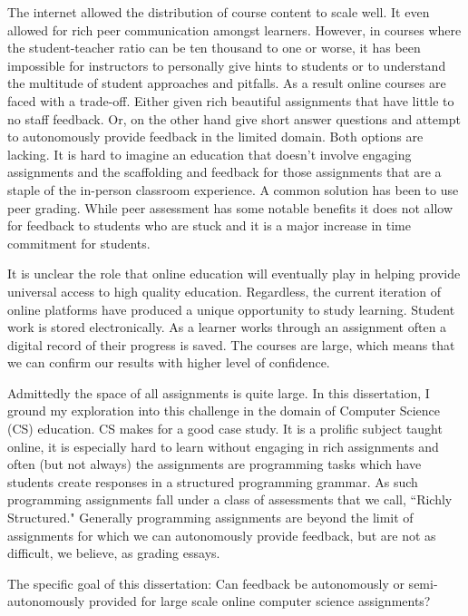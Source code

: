 The internet allowed the distribution of course content to scale well. It even allowed for rich peer communication amongst learners. However, in courses where the student-teacher ratio can be ten thousand to one or worse, it has been impossible for instructors to personally give hints to students or to understand the multitude of student approaches and pitfalls. As a result online courses are faced with a trade-off. Either given rich beautiful assignments that have little to no staff feedback. Or, on the other hand give short answer questions and attempt to autonomously provide feedback in the limited domain. Both options are lacking. It is hard to imagine an education that doesn't involve engaging assignments and the scaffolding and feedback for those assignments that are a staple of the in-person classroom experience. A common solution has been to use peer grading. While peer assessment has some notable benefits it does not allow for feedback to students who are stuck and it is a major increase in time commitment for students.

It is unclear the role that online education will eventually play in helping provide universal access to high quality education. Regardless, the current iteration of online platforms have produced a unique opportunity to study learning. Student work is stored electronically. As a learner works through an assignment often a digital record of their progress is saved. The courses are large, which means that we can confirm our results with higher level of confidence. 

Admittedly the space of all assignments is quite large. In this dissertation, I ground my exploration into this challenge in the domain of Computer Science (CS) education. CS makes for a good case study. It is a prolific subject taught online, it is especially hard to learn without engaging in rich assignments and often (but not always) the assignments are programming tasks which have students create responses in a structured programming grammar. As such programming assignments fall under a class of assessments that we call, ``Richly Structured." Generally programming assignments are beyond the limit of assignments for which we can autonomously provide feedback, but are not as difficult, we believe, as grading essays.

\begin{mdframed}
The specific goal of this dissertation: Can feedback be autonomously or semi-autonomously provided for large scale online computer science assignments?
\end{mdframed}

